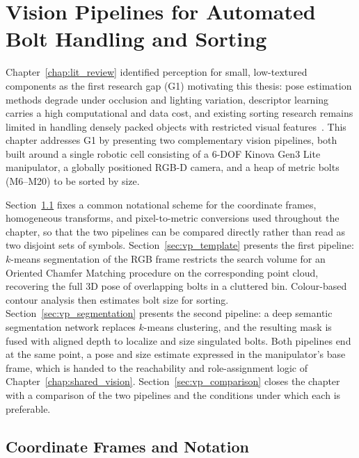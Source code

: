 \chapter{Vision Pipelines for Automated Bolt Handling and Sorting}
\label{chap:vision_pipelines}

Chapter~\ref{chap:lit_review} identified perception for small, low-textured components as the
first research gap (G1) motivating this thesis: pose estimation methods degrade under occlusion
and lighting variation, descriptor learning carries a high computational and data cost, and
existing sorting research remains limited in handling densely packed objects with restricted
visual features~\citep{sk2024bolthandling,sk2024boltsorting}. This chapter addresses G1 by
presenting two complementary vision pipelines, both built around a single robotic cell consisting
of a 6-DOF Kinova Gen3 Lite manipulator, a globally positioned RGB-D camera, and a heap of metric
bolts (M6--M20) to be sorted by size.

Section~\ref{sec:vp_notation} fixes a common notational scheme for the coordinate frames,
homogeneous transforms, and pixel-to-metric conversions used throughout the chapter, so that the
two pipelines can be compared directly rather than read as two disjoint sets of symbols.
Section~\ref{sec:vp_template} presents the first pipeline: $k$-means segmentation of the RGB frame
restricts the search volume for an Oriented Chamfer Matching procedure on the corresponding
point cloud, recovering the full 3D pose of overlapping bolts in a cluttered bin. Colour-based
contour analysis then estimates bolt size for sorting. Section~\ref{sec:vp_segmentation} presents
the second pipeline: a deep semantic segmentation network replaces $k$-means clustering, and the
resulting mask is fused with aligned depth to localize and size singulated bolts. Both pipelines
end at the same point, a pose and size estimate expressed in the manipulator's base frame, which
is handed to the reachability and role-assignment logic of Chapter~\ref{chap:shared_vision}.
Section~\ref{sec:vp_comparison} closes the chapter with a comparison of the two pipelines and the
conditions under which each is preferable.

\section{Coordinate Frames and Notation}\label{sec:vp_notation}

